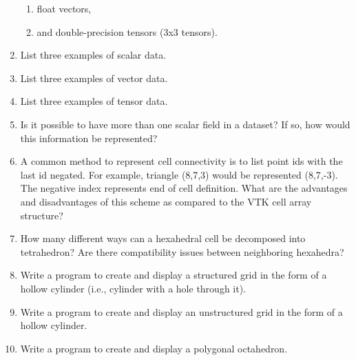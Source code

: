 \begin{enumerate}
\begin{enumerate}
	\item float vectors,

	\item and double-precision tensors (3x3 tensors).

\end{enumerate}

\item List three examples of scalar data.

\item List three examples of vector data.

\item List three examples of tensor data.

\item Is it possible to have more than one scalar field in a dataset? If so, how would this information be represented?

\item  A common method to represent cell connectivity is to list point ids with the last id negated. For example, triangle (8,7,3) would be represented (8,7,-3). The negative index represents end of cell definition. What are the advantages and disadvantages of this scheme as compared to the VTK cell array structure?

\item  How many different ways can a hexahedral cell be decomposed into tetrahedron? Are there compatibility issues between neighboring hexahedra?

\item Write a program to create and display a structured grid in the form of a hollow cylinder (i.e., cylinder with a hole through it).

\item Write a program to create and display an unstructured grid in the form of a hollow cylinder.

\item Write a program to create and display a polygonal octahedron.

\end{enumerate}
